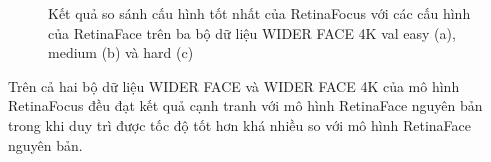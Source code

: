 {    \begin{figure}[H]
        \centering
        \caption{Kết quả so sánh cấu hình tốt nhất của RetinaFocus với các cấu hình của RetinaFace trên ba bộ dữ liệu WIDER FACE 4K val easy (a), medium (b) và hard (c)}
        \label{fig:retinafocus_widerface_val_rtnf}
    \end{figure}

    \noindent
    Trên cả hai bộ dữ liệu WIDER FACE và WIDER FACE 4K của mô hình RetinaFocus đều đạt kết quả cạnh tranh với mô hình RetinaFace nguyên bản trong khi duy trì được tốc độ tốt hơn khá nhiều so với mô hình RetinaFace nguyên bản.
}